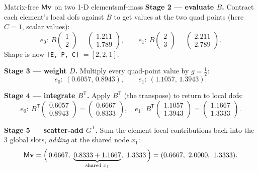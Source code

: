 \begin{workedexample}{Matrix-free $\mathsf{M}\mathbf{v}$ on two 1-D elements}{mf-mass}
\textbf{Stage 2 --- evaluate $B$.} Contract each element's local dofs against
$B$ to get values at the two quad points (here $C=1$, scalar values):
\[
  e_0:\ B\begin{pmatrix}1\\2\end{pmatrix}=\begin{pmatrix}1.211\\1.789\end{pmatrix},
  \qquad
  e_1:\ B\begin{pmatrix}2\\3\end{pmatrix}=\begin{pmatrix}2.211\\2.789\end{pmatrix}.
\]
Shape is now \lstinline[style=l4style]|[E, P, C]| $=[2,2,1]$.

\textbf{Stage 3 --- weight $D$.} Multiply every quad-point value by $g=\tfrac12$:
\[
  e_0:\ (0.6057,\,0.8943),\qquad e_1:\ (1.1057,\,1.3943).
\]

\textbf{Stage 4 --- integrate $B^{\mathsf T}$.} Apply $B^{\mathsf T}$ (the
transpose) to return to local dofs:
\[
  e_0:\ B^{\mathsf T}\!\begin{pmatrix}0.6057\\0.8943\end{pmatrix}
       =\begin{pmatrix}0.6667\\0.8333\end{pmatrix},
  \quad
  e_1:\ B^{\mathsf T}\!\begin{pmatrix}1.1057\\1.3943\end{pmatrix}
       =\begin{pmatrix}1.1667\\1.3333\end{pmatrix}.
\]

\textbf{Stage 5 --- scatter-add $G^{\mathsf T}$.} Sum the element-local
contributions back into the $3$ global slots, \emph{adding} at the shared node
$x_1$:
\[
  \mat{M}\vv=\Big(\,0.6667,\ \underbrace{0.8333+1.1667}_{\text{shared }x_1},\ 1.3333\,\Big)
            =(0.6667,\ 2.0000,\ 1.3333).
\]


\end{workedexample}
